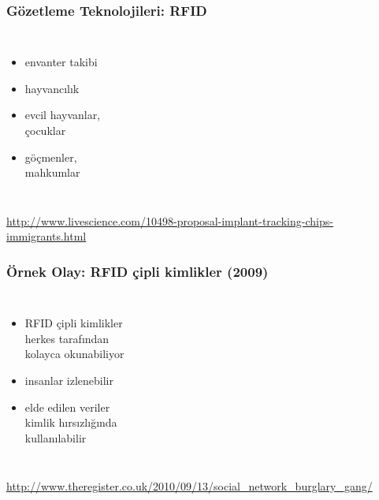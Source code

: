 \documentclass[dvipsnames]{beamer}
\theoremstyle{definition}
\theoremstyle{example}
\theoremstyle{plain}
\begin{document}
\begin{frame}
  \frametitle{Gözetleme Teknolojileri: RFID}

  \begin{columns}
    \begin{itemize}
      \item envanter takibi
      \item hayvancılık

      \pause
      \medskip
      \item evcil hayvanlar,\\
        çocuklar
      \item göçmenler,\\
        mahkumlar
    \end{itemize}

  \end{columns}

  \medskip
  \tiny{\url{http://www.livescience.com/10498-proposal-implant-tracking-chips-immigrants.html}}
\end{frame}

\begin{frame}
  \frametitle{Örnek Olay: RFID çipli kimlikler (2009)}

  \begin{columns}

    \begin{itemize}
      \item RFID çipli kimlikler\\
        herkes tarafından\\
        kolayca okunabiliyor
      \item insanlar izlenebilir
      \item elde edilen veriler\\
        kimlik hırsızlığında\\
        kullanılabilir
    \end{itemize}
  \end{columns}

  \medskip
  \tiny{\url{http://www.theregister.co.uk/2010/09/13/social_network_burglary_gang/}}
\end{frame}
\end{document}
